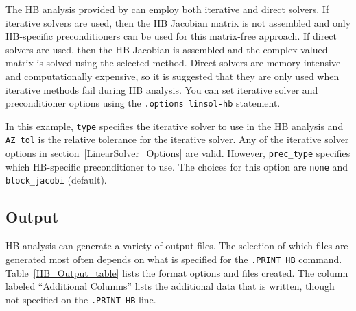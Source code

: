 The HB analysis provided by \Xyce{} can employ both iterative and
direct solvers.  If iterative solvers are used, then the HB Jacobian
matrix is not assembled and only HB-specific preconditioners can be
used for this matrix-free approach.  If direct solvers are used, then
the HB Jacobian is assembled and the complex-valued matrix is solved
using the selected method.  Direct solvers are memory intensive and
computationally expensive, so it is suggested that they are only used
when iterative methods fail during HB analysis.  You can set iterative
solver and preconditioner options using the \verb|.options linsol-hb|
statement.


In this example, \texttt{type} specifies the iterative solver to use
in the HB analysis and \texttt{AZ\_tol} is the relative tolerance for
the iterative solver.  Any of the iterative solver options in
section~\ref{LinearSolver_Options} are valid.  However,
\texttt{prec\_type} specifies which HB-specific preconditioner to
use. The choices for this option are \texttt{none} and
\texttt{block\_jacobi} (default).

\subsection{Output}
\label{HB_Output}

HB analysis can generate a variety of output files.  The selection of
which files are generated most often depends on what is specified for
the \texttt{.PRINT HB} command.  Table~\ref{HB_Output_table} lists the
format options and files created.  The column labeled ``Additional
Columns'' lists the additional data that is written, though not
specified on the \texttt{.PRINT HB} line.

